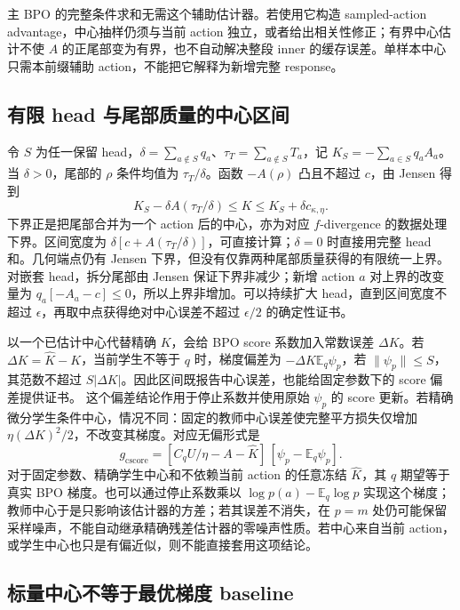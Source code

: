 \documentclass[lang=cn,scheme=chinese,openany]{../book/elegantbook}
\newcommand{\E}{\mathbb E}
\begin{document}
主 BPO 的完整条件求和无需这个辅助估计器。若使用它构造 sampled-action advantage，中心抽样仍须与当前 action 独立，或者给出相关性修正；有界中心估计不使 $A$ 的正尾部变为有界，也不自动解决整段 inner 的缓存误差。单样本中心只需本前缀辅助 action，不能把它解释为新增完整 response。
\subsection{有限 head 与尾部质量的中心区间}

令 $S$ 为任一保留 head，$\delta=\sum_{a\notin S}q_a$、$\tau_T=\sum_{a\notin S}T_a$，记 $K_S=-\sum_{a\in S}q_aA_a$。当 $\delta>0$，尾部的 $\rho$ 条件均值为 $\tau_T/\delta$。函数 $-A(\rho)$ 凸且不超过 $c$，由 Jensen 得到
\begin{equation}
 \boxed{K_S-\delta A(\tau_T/\delta)
 \le K\le K_S+\delta c_{\kappa,\eta}.}
 \label{eq:center-head-tail-interval}
\end{equation}
下界正是把尾部合并为一个 action 后的中心，亦为对应 $f$-divergence 的数据处理下界。区间宽度为 $\delta[c+A(\tau_T/\delta)]$，可直接计算；$\delta=0$ 时直接用完整 head 和。几何端点仍有 Jensen 下界，但没有仅靠两种尾部质量获得的有限统一上界。 对嵌套 head，拆分尾部由 Jensen 保证下界非减少；新增 action $a$ 对上界的改变量为 $q_a[-A_a-c]\le0$，所以上界非增加。可以持续扩大 head，直到区间宽度不超过 $\epsilon$，再取中点获得绝对中心误差不超过 $\epsilon/2$ 的确定性证书。

以一个已估计中心代替精确 $K$，会给 BPO score 系数加入常数误差 $\Delta K$。若 $\Delta K=\widehat K-K$，当前学生不等于 $q$ 时，梯度偏差为 $-\Delta K\E_q\psi_p$，若 $\|\psi_p\|\le S$，其范数不超过 $S|\Delta K|$。因此区间既报告中心误差，也能给固定参数下的 score 偏差提供证书。 这个偏差结论作用于停止系数并使用原始 $\psi_p$ 的 score 更新。若精确微分学生条件中心，情况不同：固定的教师中心误差使完整平方损失仅增加 $\eta(\Delta K)^2/2$，不改变其梯度。对应无偏形式是
\begin{equation}
 g_{\mathrm{cscore}}=
 [C_qU/\eta-A-\widehat K]\,[\psi_p-\E_q\psi_p].
\end{equation}
对于固定参数、精确学生中心和不依赖当前 action 的任意冻结 $\widehat K$，其 $q$ 期望等于真实 BPO 梯度。也可以通过停止系数乘以 $\log p(a)-\E_q\log p$ 实现这个梯度；教师中心于是只影响该估计器的方差；若其误差不消失，在 $p=m$ 处仍可能保留采样噪声，不能自动继承精确残差估计器的零噪声性质。若中心来自当前 action，或学生中心也只是有偏近似，则不能直接套用这项结论。
\subsection{标量中心不等于最优梯度 baseline}
\end{document}
